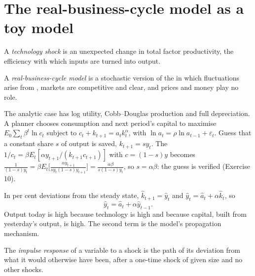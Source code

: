 \section{The real-business-cycle model as a toy model}\label{sec:b2:business-cycles:rbc}

\begin{definition}\label{def:b2:business-cycles:technology-shock}
A \emph{technology shock} is an unexpected change in total factor productivity, the efficiency with
which inputs are turned into output.
\end{definition}

\begin{definition}\label{def:b2:business-cycles:rbc}
A \emph{real-business-cycle model} is a stochastic version of the  in which
fluctuations arise from , markets are competitive and clear, and prices and money play no role.
\end{definition}

The analytic case has log utility, Cobb--Douglas production and full depreciation. A planner chooses consumption and next
period's capital to maximise $E_0\sum_t\beta^t\ln c_t$ subject to $c_t + k_{t+1} = a_tk_t^\alpha$, with $\ln a_t = \rho\ln a_{t-1} + \varepsilon_t$. Guess that a constant share $s$ of output is saved, $k_{t+1} = sy_t$. The 
$1/c_t = \beta E_t[\alpha y_{t+1}/(k_{t+1}c_{t+1})]$ with $c = (1 - s)y$ becomes $\frac{1}{(1 - s)y_t} = \beta E_t\bigl[\frac{\alpha y_{t+1}}{sy_t(1 - s)y_{t+1}}\bigr] = \frac{\alpha\beta}{s(1 - s)y_t}$, so $s = \alpha\beta$: the guess is verified (Exercise 10).

In per cent deviations from the steady state, $\hat k_{t+1} = \hat y_t$ and $\hat y_t = \hat a_t + \alpha\hat k_t$, so
\begin{equation}\label{eq:b2:business-cycles:propagation}
\hat y_t = \hat a_t + \alpha\hat y_{t-1}.
\end{equation}
Output today is high because technology is high and because capital, built from yesterday's output, is high. The second
term is the model's propagation mechanism.

\begin{definition}\label{def:b2:business-cycles:impulse-response}
The \emph{impulse response} of a variable to a shock is the path of its deviation from what it
would otherwise have been, after a one-time shock of given size and no other shocks.
\end{definition}

